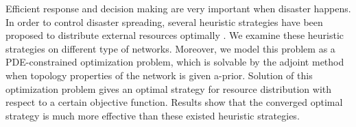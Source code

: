 Efficient response and decision making are very important when disaster happens. In order to control disaster spreading, several heuristic strategies have been proposed to distribute external resources optimally \cite{buzna2007efficient}. We examine these heuristic strategies on different type of networks. Moreover, we model this problem as a PDE-constrained optimization problem, which is solvable by the adjoint method when topology properties of the network is given a-prior. Solution of this optimization problem gives an optimal strategy for resource distribution with respect to a certain objective function. Results show that the converged optimal strategy is much more effective than these existed heuristic strategies.